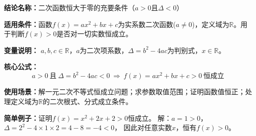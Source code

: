 \textbf{结论名称：}二次函数恒大于零的充要条件（\(a>0\)且\(\Delta<0\)）

\textbf{适用条件：}函数\(f(x)=ax^2+bx+c\)为实系数二次函数(\(a\neq0\))，定义域为\(\mathbb{R}\)。用于判断\(f(x)>0\)是否对一切实数恒成立。

\textbf{变量说明：} \(a,b,c\in\mathbb{R}\)，\(a\)为二次项系数，\(\Delta=b^2-4ac\)为判别式，\(x\in\mathbb{R}\)。

\textbf{核心公式：}
\[
\boxed{a>0\ \text{且}\ \Delta=b^2-4ac<0 \ \Longrightarrow\ f(x)=ax^2+bx+c>0\ \text{恒成立}}
\]

\textbf{使用场景：}解一元二次不等式恒成立问题；求参数取值范围；证明函数值恒正；处理定义域为\(\mathbb{R}\)的二次根式、分式成立条件。

\textbf{简单例子：}证明\(f(x)=x^2+2x+2>0\)恒成立。
解：\(a=1>0\)，\(\Delta=2^2-4\times1\times2=4-8=-4<0\)，
因此对任意实数\(x\)，恒有\(f(x)>0\)。